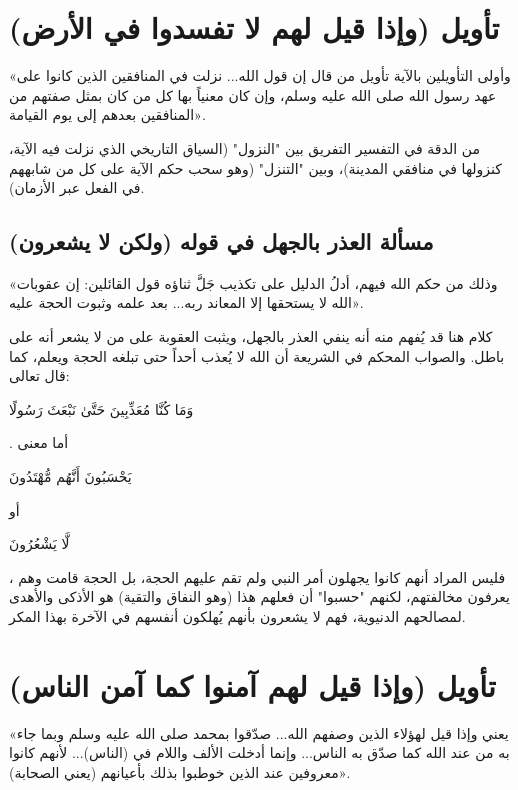 \separator

\section{تأويل (وإذا قيل لهم لا تفسدوا في الأرض)}
 «وأولى التأويلين بالآية تأويل من قال إن قول الله... نزلت في المنافقين الذين كانوا على عهد رسول الله صلى الله عليه وسلم، وإن كان معنياً بها كل من كان بمثل صفتهم من المنافقين بعدهم إلى يوم القيامة».

\begin{fawaid}
من الدقة في التفسير التفريق بين "النزول" (السياق التاريخي الذي نزلت فيه الآية، كنزولها في منافقي المدينة)، وبين "التنزل" (وهو سحب حكم الآية على كل من شابههم في الفعل عبر الأزمان).
\end{fawaid}

\subsection{مسألة العذر بالجهل في قوله (ولكن لا يشعرون)}
 «وذلك من حكم الله فيهم، أدلُ الدليل على تكذيب جَلَّ ثناؤه قول القائلين: إن عقوبات الله لا يستحقها إلا المعاند ربه... بعد علمه وثبوت الحجة عليه».

\begin{fawaid}
كلام  هنا قد يُفهم منه أنه ينفي العذر بالجهل، ويثبت العقوبة على من لا يشعر أنه على باطل. والصواب المحكم في الشريعة أن الله لا يُعذب أحداً حتى تبلغه الحجة ويعلم، كما قال تعالى: \begin{ayah}وَمَا كُنَّا مُعَذِّبِينَ حَتَّىٰ نَبْعَثَ رَسُولًا\end{ayah}.
أما معنى \begin{ayah}يَحْسَبُونَ أَنَّهُم مُّهْتَدُونَ\end{ayah} أو \begin{ayah}لَّا يَشْعُرُونَ\end{ayah}، فليس المراد أنهم كانوا يجهلون أمر النبي ولم تقم عليهم الحجة، بل الحجة قامت وهم يعرفون مخالفتهم، لكنهم "حسبوا" أن فعلهم هذا (وهو النفاق والتقية) هو الأذكى والأهدى لمصالحهم الدنيوية، فهم لا يشعرون بأنهم يُهلكون أنفسهم في الآخرة بهذا المكر.
\end{fawaid}

\separator

\section{تأويل (وإذا قيل لهم آمنوا كما آمن الناس)}
 «يعني وإذا قيل لهؤلاء الذين وصفهم الله... صدّقوا بمحمد صلى الله عليه وسلم وبما جاء به من عند الله كما صدّق به الناس... وإنما أدخلت الألف واللام في (الناس)... لأنهم كانوا معروفين عند الذين خوطبوا بذلك بأعيانهم (يعني الصحابة)».

